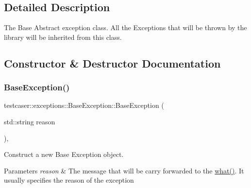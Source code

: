 \subsection{Detailed Description}
The Base Abstract exception class. All the Exceptions that will be thrown by the library will be inherited from this class. 



\subsection{Constructor \& Destructor Documentation}
\mbox{\label{classtestcaser_1_1exceptions_1_1BaseException_a70b5f42e6197e2600f7163f843060af2}} 
\subsubsection{\texorpdfstring{BaseException()}{BaseException()}}
{\footnotesize\ttfamily testcaser\+::exceptions\+::\+Base\+Exception\+::\+Base\+Exception (\begin{DoxyParamCaption}\item[{std\+::string}]{reason }\end{DoxyParamCaption})\hspace{0.3cm}{\ttfamily [inline]}, {\ttfamily [explicit]}}



Construct a new Base Exception object. 


\begin{DoxyParams}{Parameters}
{\em reason} & The message that will be carry forwarded to the \mbox{\hyperlink{classtestcaser_1_1exceptions_1_1BaseException_a28590a861913f870d9761990853e74b7}{what()}}. It usually specifies the reason of the exception \\
\hline
\end{DoxyParams}
\mbox{\label{classtestcaser_1_1exceptions_1_1BaseException_adf792df62deef0ec4f4c1e34c59179fa}} 
